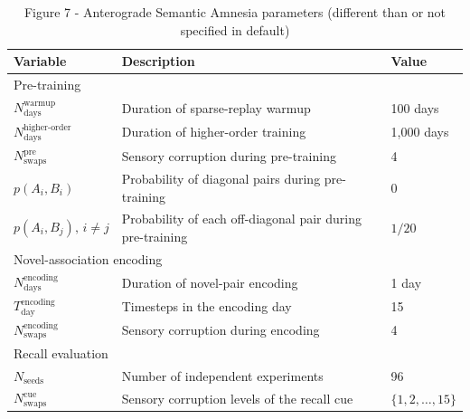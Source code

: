 \documentclass{article}
\begin{document}
\begin{table}[h!]
\centering
\caption{Figure 7 - Anterograde Semantic Amnesia parameters (different than or not specified in default)}
\label{tab:anterograde_amnesia}
\begin{tabular}{lll}
\toprule
\textbf{Variable} & \textbf{Description} & \textbf{Value} \\
\midrule
\multicolumn{3}{l}{Pre-training} \\
$N_{\textrm{days}}^{\textrm{warmup}}$ & Duration of sparse-replay warmup & 100 days \\
$N_{\textrm{days}}^{\textrm{higher-order}}$ & Duration of higher-order training & 1,000 days \\
$N_{\textrm{swaps}}^{\textrm{pre}}$ & Sensory corruption during pre-training & 4 \\
$p(A_i,B_i)$ & Probability of diagonal pairs during pre-training & 0 \\
$p(A_i,B_j),\, i\ne j$ & Probability of each off-diagonal pair during pre-training & $1/20$ \\
\midrule
\multicolumn{3}{l}{Novel-association encoding} \\
$N_{\textrm{days}}^{\textrm{encoding}}$ & Duration of novel-pair encoding & 1 day \\
$T_{\textrm{day}}^{\textrm{encoding}}$ & Timesteps in the encoding day & 15 \\
$N_{\textrm{swaps}}^{\textrm{encoding}}$ & Sensory corruption during encoding & 4 \\
\midrule
\multicolumn{3}{l}{Recall evaluation} \\
$N_{\textrm{seeds}}$ & Number of independent experiments & 96 \\
$N_{\textrm{swaps}}^{\textrm{cue}}$ & Sensory corruption levels of the recall cue & $\{1,2,\ldots,15\}$ \\
\bottomrule
\end{tabular}
\end{table}
\end{document}
